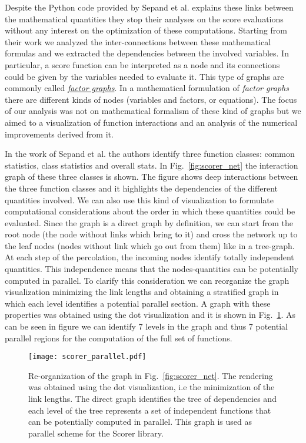 \documentclass{standalone}
\begin{document}
Despite the \textsf{Python} code provided by Sepand et al. explains these links between the mathematical quantities they stop their analyses on the score evaluations without any interest on the optimization of these computations.
Starting from their work we analyzed the inter-connections between these mathematical formulas and we extracted the dependencies between the involved variables.
In particular, a score function can be interpreted as a node and its connections could be given by the variables needed to evaluate it.
This type of graphs are commonly called \href{https://en.wikipedia.org/wiki/Factor_graph}{\emph{factor graphs}}.
In a mathematical formulation of \emph{factor graphs} there are different kinds of nodes (variables and factors, or equations).
The focus of our analysis was not on mathematical formalism of these kind of graphs but we aimed to a visualization of function interactions and an analysis of the numerical improvements derived from it.

In the work of Sepand et al. the authors identify three function classes: common statistics, class statistics and overall stats.
In Fig.~\ref{fig:scorer_net} the interaction graph of these three classes is shown.
The figure shows deep interactions between the three function classes and it highlights the dependencies of the different quantities involved.
We can also use this kind of visualization to formulate computational considerations about the order in which these quantities could be evaluated.
Since the graph is a direct graph by definition, we can start from the root node (the node without links which bring to it) and cross the network up to the leaf nodes (nodes without link which go out from them) like in a tree-graph.
At each step of the percolation, the incoming nodes identify totally independent quantities.
This independence means that the nodes-quantities can be potentially computed in parallel.
To clarify this consideration we can reorganize the graph visualization minimizing the link lengths and obtaining a stratified graph in which each level identifies a potential parallel section.
A graph with these properties was obtained using the \textsf{dot} visualization and it is shown in Fig.~\ref{fig:scorer_parallel}.
As can be seen in figure we can identify 7 levels in the graph and thus 7 potential parallel regions for the computation of the full set of functions.

\begin{center}
\begin{figure}[htbp]
\hspace{-2cm}
\texttt{[image: scorer\_parallel.pdf]}
\caption{Re-organization of the graph in Fig.~\ref{fig:scorer_net}.
The rendering was obtained using the \textsf{dot} visualization, i.e the minimization of the link lengths.
The direct graph identifies the tree of dependencies and each level of the tree represents a set of independent functions that can be potentially computed in parallel.
This graph is used as parallel scheme for the \textsf{Scorer} library.
}
\label{fig:scorer_parallel}
\end{figure}
\end{center}
\end{document}
